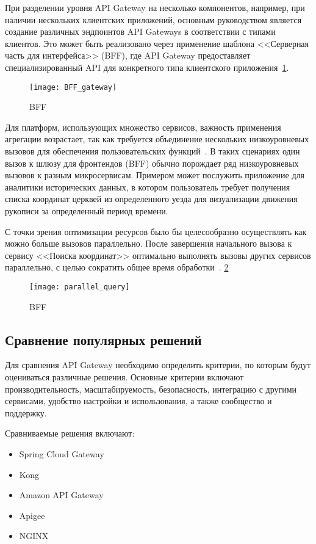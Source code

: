 При разделении уровня API Gateway на несколько компонентов, например, при наличии нескольких
клиентских приложений, основным руководством является создание различных эндпоинтов API Gateways в
соответствии
с типами клиентов.
Это может быть реализовано через применение шаблона <<Серверная часть для
интерфейса>> (BFF), где API Gateway предоставляет специализированный API для конкретного типа
клиентского приложения~\ref{fig:bff_gate}.

\begin{figure}[htbp]
    \centering
    \texttt{[image: BFF\_gateway]}
    \caption{BFF}
    \label{fig:bff_gate}
\end{figure}

Для платформ, использующих множество сервисов, важность применения агрегации возрастает, так как
требуется объединение нескольких низкоуровневых вызовов для обеспечения пользовательских функций~\cite{alkhodary2023evaluation}.
В
таких сценариях один вызов к шлюзу для фронтендов (BFF) обычно порождает ряд низкоуровневых вызовов
к разным микросервисам.
Примером может послужить приложение для аналитики исторических данных, в
котором
пользователь требует получения списка координат церквей из определенного уезда для визуализации
движения рукописи
за определенный период времени.

С точки зрения оптимизации ресурсов было бы целесообразно осуществлять как можно больше вызовов
параллельно.
После завершения начального вызова к сервису <<Поиска координат>> оптимально выполнять
вызовы других сервисов параллельно, с целью сократить общее время обработки~\cite{BFF}.
\ref{fig:parrallel_query}
\begin{figure}[htbp]
    \centering
    \texttt{[image: parallel\_query]}
    \caption{BFF}
    \label{fig:parrallel_query}
\end{figure}

\subsection{Сравнение популярных решений}

Для сравнения API Gateway необходимо определить критерии, по которым будут оцениваться различные решения.
Основные
критерии включают производительность, масштабируемость, безопасность, интеграцию с другими сервисами, удобство настройки
и использования, а также сообщество и поддержку.

Сравниваемые решения включают:
\begin{itemize}
    \item Spring Cloud Gateway
    \item Kong
    \item Amazon API Gateway
    \item Apigee
    \item NGINX

\end{itemize}

